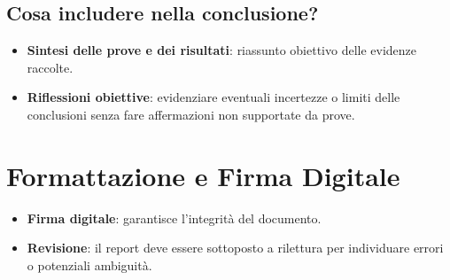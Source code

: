 \documentclass[a4paper,12pt]{report}
\begin{document}
\subsection{Cosa includere nella conclusione?}
\begin{itemize}
    \item \textbf{Sintesi delle prove e dei risultati}: riassunto obiettivo delle evidenze raccolte.
    \item \textbf{Riflessioni obiettive}: evidenziare eventuali incertezze o limiti delle conclusioni senza fare affermazioni non supportate da prove.
\end{itemize}

\section{Formattazione e Firma Digitale}
\begin{itemize}
    \item \textbf{Firma digitale}: garantisce l'integrità del documento.
    \item \textbf{Revisione}: il report deve essere sottoposto a rilettura per individuare errori o potenziali ambiguità.
\end{itemize}
\end{document}

